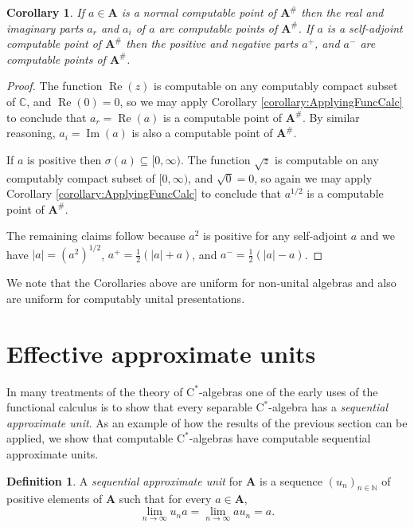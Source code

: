 \documentclass{amsart}
\newcommand{\abs}[1]{\left\vert #1 \right\vert}
\newcommand{\boldA}{\mathbf{A}}
\newcommand{\cstar}{$\mathrm{C}^*$}
\theoremstyle{plain}
\newtheorem{corollary}[theorem]{Corollary}
\theoremstyle{definition}
\newtheorem{definition}[theorem]{Definition}
\numberwithin{equation}{section}
\begin{document}
\begin{corollary}\label{corollary:PositiveNegativeParts}
If $a \in \boldA$ is a normal computable point of $\boldA^\#$ then the real and imaginary parts $a_r$ and $a_i$ of $a$ are computable points of $\boldA^\#$.  If $a$ is a self-adjoint computable point of $\boldA^\#$ then the positive and negative parts $a^+$, and $a^-$ are computable points of $\boldA^\#$.
\end{corollary}
\begin{proof}
The function $\operatorname{Re}(z)$ is computable on any computably compact subset of $\mathbb{C}$, and $\operatorname{Re}(0) = 0$, so we may apply Corollary \ref{corollary:ApplyingFuncCalc} to conclude that $a_r = \operatorname{Re}(a)$ is a computable point of $\boldA^\#$.  By similar reasoning, $a_i = \operatorname{Im}(a)$ is also a computable point of $\boldA^\#$.

If $a$ is positive then $\sigma(a) \subseteq [0, \infty)$.  The function $\sqrt{z}$ is computable on any computably compact subset of $[0, \infty)$, and $\sqrt{0} = 0$, so again we may apply Corollary \ref{corollary:ApplyingFuncCalc} to conclude that $a^{1/2}$ is a computable point of $\boldA^\#$.  

The remaining claims follow because $a^2$ is positive for any self-adjoint $a$ and we have $\abs{a} = (a^2)^{1/2}$, $a^+ = \frac{1}{2}(\abs{a}+a)$, and $a^- = \frac{1}{2}(\abs{a}-a)$.
\end{proof}

We note that the Corollaries above are uniform for non-unital algebras and also are uniform for computably unital presentations.

\section{Effective approximate units}
In many treatments of the theory of \cstar-algebras one of the early uses of the functional calculus is to show that every separable \cstar-algebra has a \emph{sequential approximate unit}.  As an example of how the results of the previous section can be applied, we show that computable \cstar-algebras have computable sequential approximate units.

\begin{definition}
A \emph{sequential approximate unit} for $\boldA$ is a sequence $(u_n)_{n \in \mathbb{N}}$ of positive elements of $\boldA$ such that for every $a \in \boldA$,
\[\lim_{n\to\infty}u_na = \lim_{n\to\infty}au_n = a.\]
\end{definition}
\end{document}
